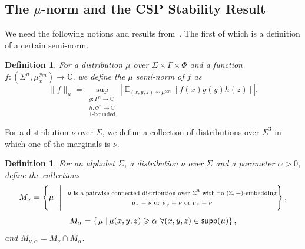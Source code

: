 \documentclass[10pt,a4paper]{amsart}
\newtheorem{definition}[thm]{Definition}
\newcommand\card[1]{\left| {#1} \right|}
\newcommand\sett[2]{\left\{ \left. #1 \;\right\vert #2 \right\}}
\newcommand\norm[1]{\| #1 \|}
\newcommand\Expect[2]{{\mathop{\mathbb{E}}_{#1}\left[ {#2} \right]}}
\renewcommand\geq{\geqslant}
\begin{document}
\subsection{The \texorpdfstring{$\mu$}{mu}-norm and the CSP Stability Result}
We need the following notions and results from~\cite{BKM5}. The first of which is a definition of a certain semi-norm.
	\begin{definition}
		For a distribution $\mu$ over $\Sigma\times \Gamma\times \Phi$
		and a function $f\colon (\Sigma^n,\mu_x^{\otimes n})\to\mathbb{C}$,
		we define the $\mu$ semi-norm of $f$ as
		\[
		\norm{f}_{\mu}
		=\sup_{\substack{g\colon \Gamma^n\to\mathbb{C}\\ h\colon \Phi^n\to\mathbb{C}\\ \text{$1$-bounded}}}\card{\Expect{(x,y,z)\sim \mu^{\otimes n}}{f(x)g(y)h(z)}}.
		\]
	\end{definition}
    For a distribution $\nu$ over $\Sigma$, we define a collection of distributions over $\Sigma^3$ in which one of the marginals is $\nu$.
	\begin{definition}\label{def:set_of_dists}
		For an alphabet $\Sigma$, a distribution $\nu$ over $\Sigma$ and a parameter $\alpha>0$, define the collections
		\[
		M_{\nu} = \left\{\mu~~\Bigg|~~\substack{\text{\normalsize $\mu$ is a pairwise connected distribution over $\Sigma^3$ with no $(\mathbb{Z}, +)$-embedding}\\\\
        \text{\normalsize$\mu_x = \nu$\text{ or }$\mu_y=\nu$\text{ or }$\mu_z = \nu$}}\right\},
		\]
		\[
		M_{\alpha} = \sett{\mu}{\mu(x,y,z)\geq \alpha~\forall(x,y,z)\in {\sf supp}(\mu)},
		\]
		and $M_{\nu,\alpha} = M_{\nu}\cap M_{\alpha}$.
	\end{definition}
	
\end{document}
